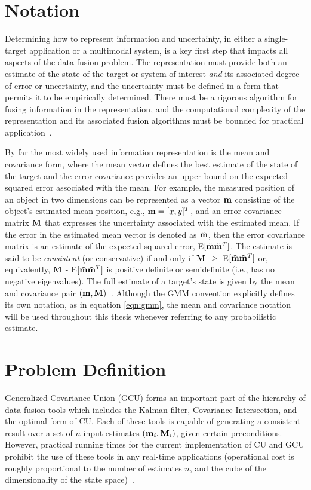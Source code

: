 \section{Notation}

Determining how to represent information and uncertainty, in either a single-target application or a multimodal system,
is a key first step that impacts all aspects of the data fusion problem. The representation must provide both an
estimate of the state of the target or system of interest {\em and} its associated degree of error or uncertainty, and
the uncertainty must be defined in a form that permits it to be empirically determined. There must be a rigorous
algorithm for fusing information in the representation, and the computational complexity of the representation and its
associated fusion algorithms must be bounded for practical application~\cite{fusion06}.

By far the most widely used information representation is the mean and covariance form, where the mean vector defines
the best estimate of the state of the target and the error covariance provides an upper bound on the expected squared
error associated with the mean. For example, the measured position of an object in two dimensions can be represented as
a vector $\mathbf{m}$ consisting of the object's estimated mean position, e.g., $\mathbf{m} = [x,y]^T$, and an
error covariance matrix $\mathbf{M}$ that expresses the uncertainty associated with the estimated mean.  If the error in
the estimated mean vector is denoted as $\tilde{\mathbf{m}}$, then the error covariance matrix is an estimate of the expected squared
error, E$[\tilde{\mathbf{m}}\tilde{\mathbf{m}}^T]$. The estimate is said to be {\em consistent} (or conservative) if and only if $\mathbf{M}$ $\geq$
E$[\tilde{\mathbf{m}}\tilde{\mathbf{m}}^T]$ or, equivalently, $\mathbf{M}$ - E$[\tilde{\mathbf{m}}\tilde{\mathbf{m}}^T]$ is positive definite or semidefinite (i.e., has no negative
eigenvalues). The full estimate of a target's state is given by the mean and covariance pair
$(\mathbf{m},\mathbf{M})$~\cite{fusion06,uhlmann03}. Although the GMM convention explicitly defines its own notation, as in
equation \ref{eqn:gmm}, the mean and covariance notation will be used throughout this thesis whenever referring to any
probabilistic estimate.


\section{Problem Definition}

Generalized Covariance Union (GCU) forms an important part of the hierarchy of data fusion tools which includes the
Kalman filter, Covariance Intersection, and the optimal form of CU. Each of these tools is capable of generating a
consistent result over a set of $n$ input estimates $(\mathbf{m}_i,\mathbf{M}_i)$, given certain preconditions. However, practical
running times for the current implementation of CU and GCU prohibit the use of these tools in any real-time
applications (operational cost is roughly proportional to the number of estimates $n$, and the cube of the
dimensionality of the state space)~\cite{fusion06}.

